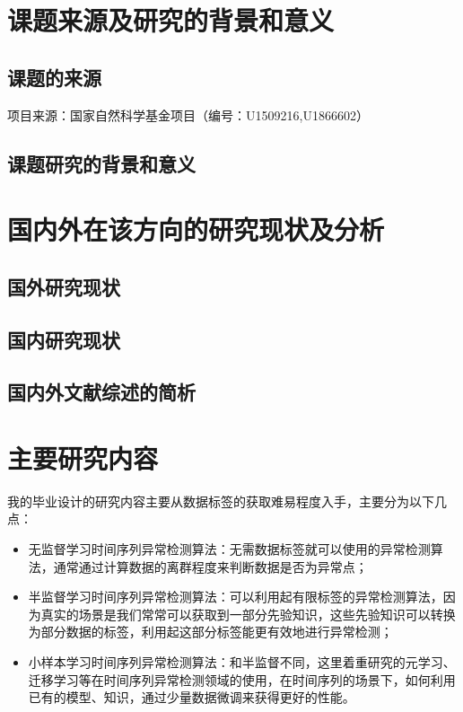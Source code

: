 \section{课题来源及研究的背景和意义}

\subsection{课题的来源}

项目来源：国家自然科学基金项目（编号：U1509216,U1866602）

\subsection{课题研究的背景和意义}

\section{国内外在该方向的研究现状及分析}

\subsection{国外研究现状}

\subsection{国内研究现状}

\subsection{国内外文献综述的简析}

\section{主要研究内容}

我的毕业设计的研究内容主要从数据标签的获取难易程度入手，主要分为以下几点：

\begin{itemize}
    \item 无监督学习时间序列异常检测算法：无需数据标签就可以使用的异常检测算法，通常通过计算数据的离群程度来判断数据是否为异常点；
    \item 半监督学习时间序列异常检测算法：可以利用起有限标签的异常检测算法，因为真实的场景是我们常常可以获取到一部分先验知识，这些先验知识可以转换为部分数据的标签，利用起这部分标签能更有效地进行异常检测；
    \item 小样本学习时间序列异常检测算法：和半监督不同，这里着重研究的元学习、迁移学习等在时间序列异常检测领域的使用，在时间序列的场景下，如何利用已有的模型、知识，通过少量数据微调来获得更好的性能。
\end{itemize}

